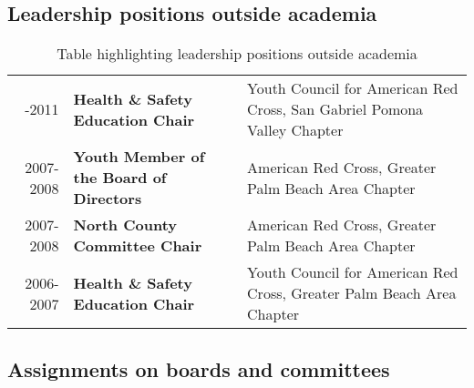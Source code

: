 \subsection{Leadership positions outside academia} \label{ssec:leadership-positions-outside-academia}

\begin{table}[h!]
	\centering
	\footnotesize
	\caption{Table highlighting leadership positions outside academia}
	\begin{tabular}{r|>{\bfseries}lp{20em}}
		\centering
		2008-2011 & Health \& Safety Education Chair       & Youth Council for American Red Cross, San Gabriel Pomona Valley Chapter \\
		2007-2008 & Youth Member of the Board of Directors & American Red Cross, Greater Palm Beach Area Chapter                     \\
		2007-2008 & North County Committee Chair           & American Red Cross, Greater Palm Beach Area Chapter                     \\
		2006-2007 & Health \& Safety Education Chair       & Youth Council for American Red Cross, Greater Palm Beach Area Chapter   \\
	\end{tabular}
\end{table}

\subsection{Assignments on boards and committees} \label{ssec:assignments-on-boards-and-committees}

